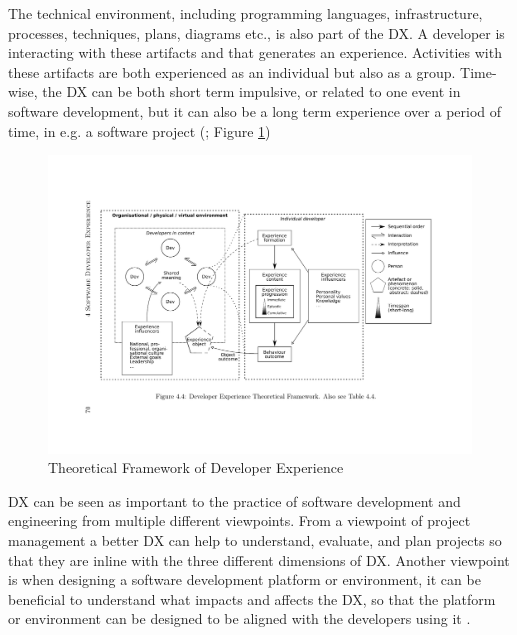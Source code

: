 \documentclass[english, 12pt, a4paper, sci, utf8, a-1b, online]{aaltothesis}
\begin{document}
The technical environment, including programming languages, infrastructure, processes, techniques, plans, diagrams etc., is also part of the DX. A developer is interacting with these artifacts and that generates an experience. Activities with these artifacts are both experienced as an individual but also as a group. Time-wise, the DX can be both short term impulsive, or related to one event in software development, but it can also be a long term experience over a period of time, in e.g. a software project (\cite{fagerholm-doctoral-thesis}; Figure \ref{figure:theoretical-framework})

\begin{figure}[H]
  \begin{center}
    \includegraphics[width=\textwidth]{theoretical-framework.pdf}
  \end{center}
  \captionsetup{width=0.6\textwidth}
  \caption{Theoretical Framework of Developer Experience \parencite{fagerholm-doctoral-thesis}}
  \label{figure:theoretical-framework}
\end{figure}

DX can be seen as important to the practice of software development and engineering from multiple different viewpoints. From a viewpoint of project management a better DX can help to understand, evaluate, and plan projects so that they are inline with the three different dimensions of DX. Another viewpoint is when designing a software development platform or environment, it can be beneficial to understand what impacts and affects the DX, so that the platform or environment can be designed to be aligned with the developers using it \parencite{fagerholm-dx-concept-and-definition}.
\end{document}
